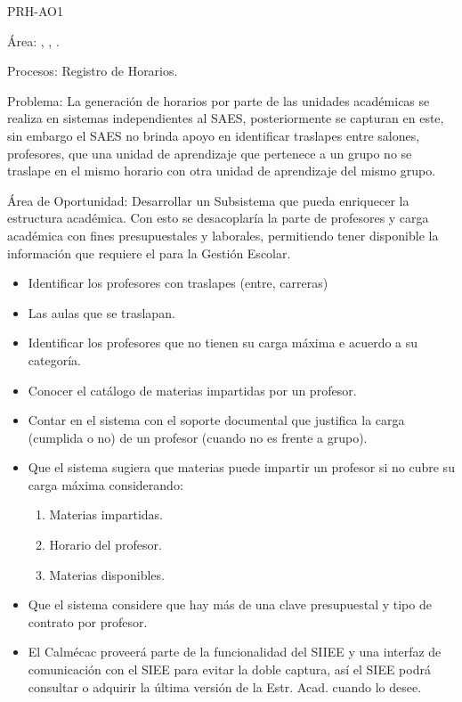 
\begin{AreaOportunidad}{PRH-AO1}
	\item[Área:] , , .
	\item[Procesos:] Registro de Horarios.
	
	\item[Problema:] La generación de horarios por parte de las unidades académicas se realiza en sistemas independientes al SAES, posteriormente se capturan en este, sin embargo el SAES no brinda apoyo en identificar traslapes entre salones, profesores, que una unidad de aprendizaje que pertenece a un grupo no se traslape en el mismo horario con otra unidad de aprendizaje del mismo grupo. 
	
	\item[Área de Oportunidad:]Desarrollar un Subsistema que pueda enriquecer la estructura académica. Con esto se desacoplaría la parte de profesores y carga académica con fines presupuestales y laborales, permitiendo tener disponible la información que requiere el  para la Gestión Escolar.
		\begin{itemize}
			\item Identificar los profesores con traslapes (entre, carreras)
			\item Las aulas que se traslapan.
			\item Identificar los profesores que no tienen su carga máxima e acuerdo a su categoría.
			\item Conocer el catálogo de materias impartidas por un profesor.
			\item Contar en el sistema con el soporte documental que justifica la carga (cumplida o no) de un profesor (cuando no es frente a grupo).
			\item Que el sistema sugiera que materias puede impartir un profesor si no cubre su carga máxima considerando:
				\begin{enumerate}
					\item Materias impartidas.
					\item Horario del profesor.
					\item Materias disponibles.
				\end{enumerate}
			\item Que el sistema considere que hay más de una clave presupuestal y tipo de contrato por profesor.
			\item El Calmécac proveerá parte de la funcionalidad del SIIEE y una interfaz de comunicación con el SIEE para evitar la doble captura, así el SIEE podrá consultar o adquirir la última versión de la Estr. Acad. cuando lo desee.
		\end{itemize}
	

\end{AreaOportunidad}
